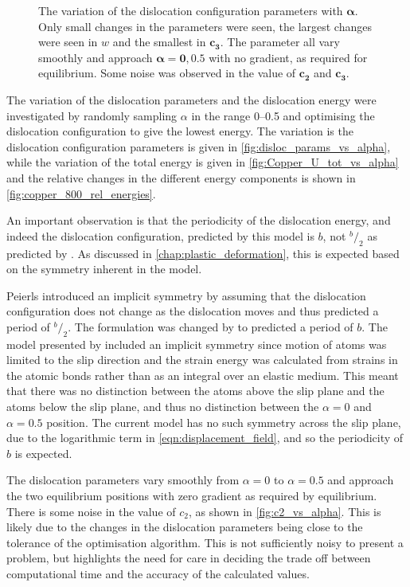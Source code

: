 \begin{figure}
\caption[The variation of the dislocation configuration parameters as a function of the dislocation position.]{The variation of the dislocation configuration parameters with $\mathbf{\alpha}$. Only small changes in the parameters were seen, the largest changes were seen in $w$ and the smallest in $\mathbf{c_3}$. The parameter all vary smoothly and approach $\mathbf{\alpha=0, 0.5}$ with no gradient, as required for equilibrium. Some noise was observed in the value of $\mathbf{c_2}$ and $\mathbf{c_3}$. \label{fig:disloc_params_vs_alpha}}
\end{figure}


The variation of the dislocation parameters and the dislocation energy were investigated by randomly sampling $\alpha$ in the range \numrange{0}{0.5} and optimising the dislocation configuration to give the lowest energy. The variation is the dislocation configuration parameters is given in \autoref{fig:disloc_params_vs_alpha}, while the variation of the total energy is given in \autoref{fig:Copper_U_tot_vs_alpha} and the relative changes in the different energy components is shown in \ref{fig:copper_800_rel_energies}.

An important observation is that the periodicity of the dislocation energy, and indeed the dislocation configuration, predicted by this model is $b$, not $^b\!/_2$ as predicted by \citet{Peierls1940,Clegg2006}. As discussed in \autoref{chap:plastic_deformation}, this is expected based on the symmetry inherent in the model. 

Peierls introduced an implicit symmetry by assuming that the dislocation configuration does not change as the dislocation moves and thus predicted a period of $^b\!/_2$. The formulation was changed by \citet{Huntington1955} to predicted a period of $b$. The model presented by \citet{Clegg2006} included an implicit symmetry since motion of atoms was limited to the slip direction and the strain energy was calculated from strains in the atomic bonds rather than as an integral over an elastic medium. This meant that there was no distinction between the atoms above the slip plane and the atoms below the slip plane, and thus no distinction between the $\alpha = 0$ and $\alpha = 0.5$ position. The current model has no such symmetry across the slip plane, due to the logarithmic term in \autoref{eqn:displacement_field}, and so the periodicity of $b$ is expected.

The dislocation parameters vary smoothly from $\alpha = 0$ to $\alpha = 0.5$ and approach the two equilibrium positions with zero gradient as required by equilibrium. There is some noise in the value of $c_2$, as shown in \ref{fig:c2_vs_alpha}. This is likely due to the changes in the dislocation parameters being close to the tolerance of the optimisation algorithm. This is not sufficiently noisy to present a problem, but highlights the need for care in deciding the trade off between computational time and the accuracy of the calculated values.



